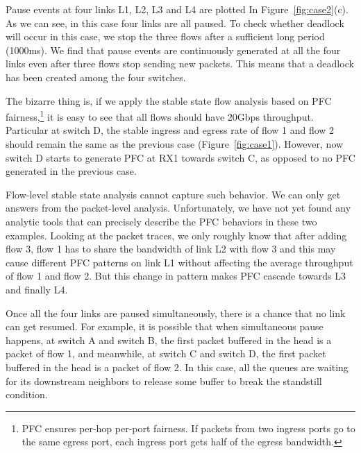Pause events at four links L1, L2, L3 and L4 are plotted In Figure~\ref{fig:case2}(c). As we can see, in 
this case four links are all paused. To check whether deadlock will occur in this case, we stop the three 
flows after a sufficient long period (1000ms). We find that pause events are continuously 
generated at all the four links even after three flows stop sending new packets. 
This means that a deadlock has been created among the four switches.

The bizarre thing is, if we apply the stable state flow analysis based on PFC fairness,\footnote{PFC
ensures per-hop per-port fairness. If packets from two ingress ports go to the same egress port, each ingress 
port gets half of the egress bandwidth.} it is easy to see that all flows should have 20Gbps throughput.
Particular at switch D, the stable ingress and egress rate of flow 1 and flow 2 should remain the same as
the previous case (Figure~\ref{fig:case1}). However, now switch D starts to generate PFC at RX1 towards 
switch C, as opposed to no PFC generated in the previous case. 


Flow-level stable state analysis cannot capture such behavior. We can only get answers from the 
packet-level analysis. Unfortunately, we have not yet found any analytic tools that can precisely
describe the PFC behaviors in these two examples. Looking at the packet traces, we only roughly know that 
after adding flow 3, flow 1 has to share the bandwidth of link L2 with flow 3 and this may cause
different PFC patterns on link L1 without affecting the average throughput of flow 1 and flow 2.
But this change in pattern makes PFC cascade towards L3 and finally L4.


Once all the four links are paused simultaneously, there is a chance that no link can get resumed. 
For example, it is possible that when simultaneous pause happens, at switch A and switch B, the 
first packet buffered in the head is a packet of flow 1, and meanwhile, at switch C and switch 
D, the first packet buffered in the head is a packet of flow 2. 
In this case, all the queues are waiting for its downstream neighbors to release some 
buffer to break the standstill condition.

